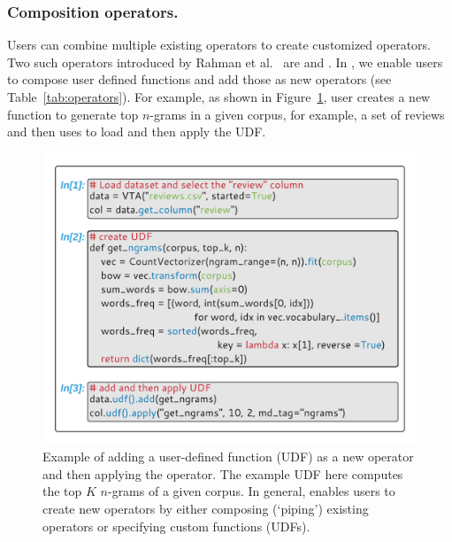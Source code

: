 \subsubsection{Composition operators.}
Users can combine multiple existing operators to create customized operators. Two such operators introduced by Rahman et al.~\cite{rahman2020leam} are  and . In \system, we enable users to compose user defined functions and add those as new operators (see Table~\ref{tab:operators}). For example, as shown in Figure~\ref{fig:udf}, user creates a new function to generate top $n$-grams in a given corpus, for example, a set of reviews and then uses \vital to load and then apply the UDF.

\begin{figure}[!htb] 
  \centering
  \includegraphics[width=\linewidth]{figures/udfs.pdf}
  \caption{\small  Example of adding a user-defined function (UDF) as a new operator and then applying the operator. The example UDF here computes the top $K$ $n$-grams of a given corpus. In general, \system enables users to create new operators by either composing (`piping') existing operators or specifying custom functions (UDFs).\label{fig:udf}} 
\end{figure}



